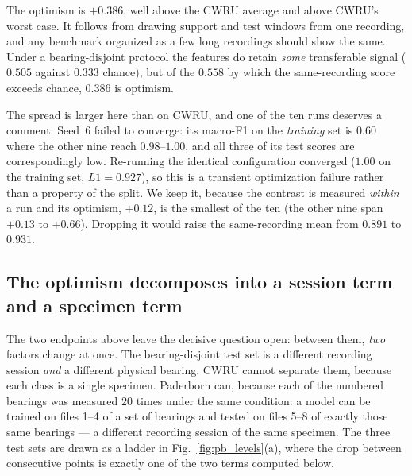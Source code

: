 \documentclass[preprint,12pt]{elsarticle}
\begin{document}
The optimism is $+0.386$, well above the CWRU average and above CWRU's worst
case. It follows from drawing support and test windows from one
recording, and any benchmark organized as a few long recordings should show the
same. Under a bearing-disjoint protocol the features do retain
\emph{some} transferable signal ($0.505$ against $0.333$ chance), but of the
$0.558$ by which the same-recording score exceeds chance, $0.386$ is optimism.

The spread is larger here than on CWRU, and one of the ten runs deserves a
comment. Seed~6 failed to converge: its macro-F1 on the \emph{training} set is
$0.60$ where the other nine reach $0.98$--$1.00$, and all three of its test
scores are correspondingly low. Re-running the identical configuration
converged ($1.00$ on the training set, $L1 = 0.927$), so this is a transient
optimization failure rather than a property of the split. We keep it, because
the contrast is measured \emph{within} a run and its optimism, $+0.12$, is the
smallest of the ten (the other nine span $+0.13$ to $+0.66$). Dropping it would
raise the same-recording mean from $0.891$ to $0.931$.

\subsection{The optimism decomposes into a session term and a specimen term}

The two endpoints above leave the decisive question open: between them,
\emph{two} factors change at once. The bearing-disjoint test set is a different recording session \emph{and}
a different physical bearing. CWRU cannot separate them, because each class is a
single specimen. Paderborn can, because each of the numbered bearings was
measured $20$ times under the same condition: a model can be trained on files 1--4 of a
set of bearings and tested on files 5--8 of exactly those same bearings --- a
different recording session of the same specimen. The three test sets are drawn
as a ladder in Fig.~\ref{fig:pb_levels}(a), where the drop between consecutive
points is exactly one of the two terms computed below.
\end{document}
